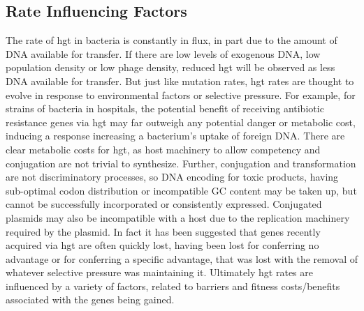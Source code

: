\documentclass[12pt,letter]{article}
\begin{document}
\subsection{Rate Influencing Factors}
The rate of \ac{hgt} in bacteria is constantly in flux, in part due to the amount of DNA available for transfer\citep{trendbs}.
If there are low levels of exogenous DNA, low population density or low phage density, reduced \ac{hgt} will be observed as less DNA available for transfer\citep{lgt}.
But just like mutation rates, \ac{hgt} rates are thought to evolve in response to environmental factors or selective pressure\citep{mtrate,hgtrate}.
For example, for strains of bacteria in hospitals, the potential benefit of receiving antibiotic resistance genes via \ac{hgt} may far outweigh any potential danger or metabolic cost, inducing a response increasing a bacterium's uptake of foreign DNA.\citep{hospital}
There are clear metabolic costs for \ac{hgt}, as host machinery to allow competency and conjugation are not trivial to synthesize\citep{hgtcost}.
Further, conjugation and transformation are not discriminatory processes, so DNA encoding for toxic products, having sub-optimal codon distribution or incompatible GC content may be taken up, but cannot be successfully incorporated or consistently expressed\citep{hgtcost}.
Conjugated plasmids may also be incompatible with a host due to the replication machinery required by the plasmid\citep{plasincom}.
In fact it has been suggested that genes recently acquired via \ac{hgt} are often quickly lost, having been lost for conferring no advantage or for conferring a specific advantage, that was lost with the removal of whatever selective pressure was maintaining it\citep{fastlane}.
Ultimately \ac{hgt} rates are influenced by a variety of factors, related to barriers and fitness costs/benefits associated with the genes being gained.
\end{document}
